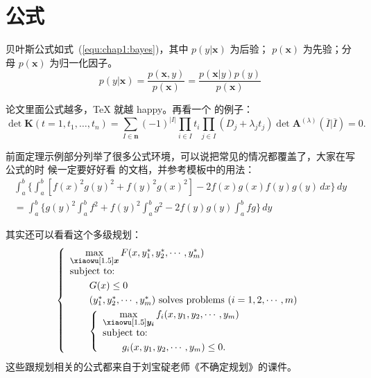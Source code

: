 \section{公式}
\label{sec:equation}
贝叶斯公式如式~(\ref{equ:chap1:bayes})，其中 $p(y|\mathbf{x})$ 为后验；
$p(\mathbf{x})$ 为先验；分母 $p(\mathbf{x})$ 为归一化因子。
\begin{equation}
\label{equ:chap1:bayes}
p(y|\mathbf{x}) = \frac{p(\mathbf{x},y)}{p(\mathbf{x})}=
\frac{p(\mathbf{x}|y)p(y)}{p(\mathbf{x})}
\end{equation}

论文里面公式越多，\TeX{} 就越 happy。再看一个  的例子：
\newcommand{\envert}[1]{\left\lvert#1\right\rvert}
\begin{equation}\label{detK2}
\det\mathbf{K}(t=1,t_1,\dots,t_n)=\sum_{I\in\mathbf{n}}(-1)^{\envert{I}}
\prod_{i\in I}t_i\prod_{j\in I}(D_j+\lambda_jt_j)\det\mathbf{A}
^{(\lambda)}(\overline{I}|\overline{I})=0.
\end{equation}

前面定理示例部分列举了很多公式环境，可以说把常见的情况都覆盖了，大家在写公式的时
候一定要好好看  的文档，并参考模板中的用法：
\begin{multline*}%
\int_a^b\biggl\{\int_a^b[f(x)^2g(y)^2+f(y)^2g(x)^2]
 -2f(x)g(x)f(y)g(y)\,dx\biggr\}\,dy \\
 =\int_a^b\biggl\{g(y)^2\int_a^bf^2+f(y)^2
  \int_a^b g^2-2f(y)g(y)\int_a^b fg\biggr\}\,dy
\end{multline*}

其实还可以看看这个多级规划：
\begin{equation}\label{bilevel}
\left\{\begin{array}{l}
\max\limits_{{\mbox{\footnotesize\boldmath $x$}}} F(x,y_1^*,y_2^*,\cdots,y_m^*)\\[0.2cm]
\mbox{subject to:}\\[0.1cm]
\qquad G(x)\le 0\\[0.1cm]
\qquad(y_1^*,y_2^*,\cdots,y_m^*)\mbox{ solves problems }(i=1,2,\cdots,m)\\[0.1cm]
\qquad\left\{\begin{array}{l}
    \max\limits_{{\mbox{\footnotesize\boldmath $y_i$}}}f_i(x,y_1,y_2,\cdots,y_m)\\[0.2cm]
    \mbox{subject to:}\\[0.1cm]
    \qquad g_i(x,y_1,y_2,\cdots,y_m)\le 0.
    \end{array}\right.
\end{array}\right.
\end{equation}
这些跟规划相关的公式都来自于刘宝碇老师《不确定规划》的课件。
